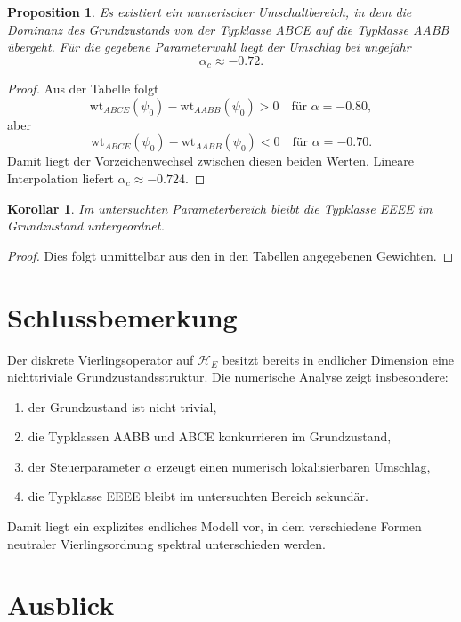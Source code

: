 \documentclass[11pt,a4paper]{article}
\newtheorem{proposition}[definition]{Proposition}
\newtheorem{corollary}[definition]{Korollar}
\theoremstyle{remark}
\newcommand{\HE}{\mathcal H_E}
\newcommand{\wt}{\mathrm{wt}}
\begin{document}
	\begin{proposition}
		Es existiert ein numerischer Umschaltbereich, in dem die Dominanz des Grundzustands von der Typklasse ABCE auf die Typklasse AABB übergeht. Für die gegebene Parameterwahl liegt der Umschlag bei ungefähr
		\[
		\alpha_c\approx -0.72.
		\]
	\end{proposition}
	
	\begin{proof}
		Aus der Tabelle folgt
		\[
		\wt_{ABCE}(\psi_0)-\wt_{AABB}(\psi_0)>0
		\quad\text{für }\alpha=-0.80,
		\]
		aber
		\[
		\wt_{ABCE}(\psi_0)-\wt_{AABB}(\psi_0)<0
		\quad\text{für }\alpha=-0.70.
		\]
		Damit liegt der Vorzeichenwechsel zwischen diesen beiden Werten. Lineare Interpolation liefert \(\alpha_c\approx -0.724\).
	\end{proof}
	
	\begin{corollary}
		Im untersuchten Parameterbereich bleibt die Typklasse EEEE im Grundzustand untergeordnet.
	\end{corollary}
	
	\begin{proof}
		Dies folgt unmittelbar aus den in den Tabellen angegebenen Gewichten.
	\end{proof}
	
	\section{Schlussbemerkung}
	
	Der diskrete Vierlingsoperator auf \(\HE\) besitzt bereits in endlicher Dimension eine nichttriviale Grundzustandsstruktur. Die numerische Analyse zeigt insbesondere:
	\begin{enumerate}[label=(\roman*)]
		\item der Grundzustand ist nicht trivial,
		\item die Typklassen AABB und ABCE konkurrieren im Grundzustand,
		\item der Steuerparameter \(\alpha\) erzeugt einen numerisch lokalisierbaren Umschlag,
		\item die Typklasse EEEE bleibt im untersuchten Bereich sekundär.
	\end{enumerate}
	
	Damit liegt ein explizites endliches Modell vor, in dem verschiedene Formen neutraler Vierlingsordnung spektral unterschieden werden.
	
	\section*{Ausblick}
	
\end{document}
